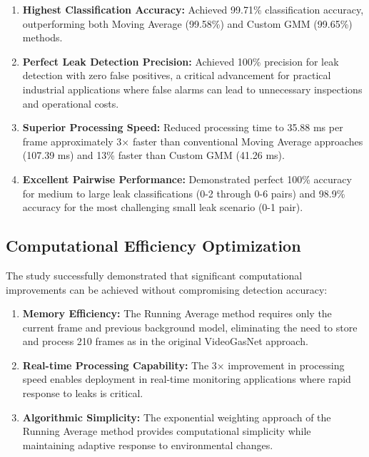 \begin{enumerate}
\item \textbf{Highest Classification Accuracy:} Achieved 99.71\% classification accuracy, outperforming both Moving Average (99.58\%) and Custom GMM (99.65\%) methods.

\item \textbf{Perfect Leak Detection Precision:} Achieved 100\% precision for leak detection with zero false positives, a critical advancement for practical industrial applications where false alarms can lead to unnecessary inspections and operational costs.

\item \textbf{Superior Processing Speed:} Reduced processing time to 35.88 ms per frame approximately 3× faster than conventional Moving Average approaches (107.39 ms) and 13\% faster than Custom GMM (41.26 ms).

\item \textbf{Excellent Pairwise Performance:} Demonstrated perfect 100\% accuracy for medium to large leak classifications (0-2 through 0-6 pairs) and 98.9\% accuracy for the most challenging small leak scenario (0-1 pair).
\end{enumerate}

\subsection{Computational Efficiency Optimization}

The study successfully demonstrated that significant computational improvements can be achieved without compromising detection accuracy:

\begin{enumerate}
\item \textbf{Memory Efficiency:} The Running Average method requires only the current frame and previous background model, eliminating the need to store and process 210 frames as in the original VideoGasNet approach.

\item \textbf{Real-time Processing Capability:} The 3× improvement in processing speed enables deployment in real-time monitoring applications where rapid response to leaks is critical.

\item \textbf{Algorithmic Simplicity:} The exponential weighting approach of the Running Average method provides computational simplicity while maintaining adaptive response to environmental changes.
\end{enumerate}

